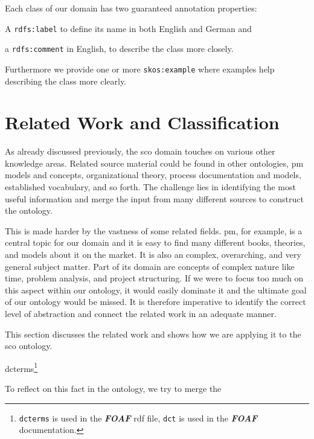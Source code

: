 \documentclass[a4paper, DIV=13, BCOR=0cm]{scrbook}
\newcommand{\prop}[1]{\texttt{#1}}
\newcommand{\pn}[1]{\textit{\textbf{#1}}}
\begin{document}
Each class of our domain has two guaranteed annotation properties:
\begin{inparaenum}
\item A \prop{rdfs:label} to define its name in both English and German and
\item a \prop{rdfs:comment} in English, to describe the class more closely.
\end{inparaenum}
Furthermore we provide one or more \prop{skos:example} where examples help describing the class more clearly.

\section{Related Work and Classification }
\label{related-work}
As already discussed previously, the \gls{sco} domain touches on various other knowledge areas. Related source material could be found in other ontologies, \gls{pm} models and concepts, organizational theory, process documentation and models, established vocabulary, and so forth. The challenge lies in identifying the most useful information and merge the input from many different sources to construct the ontology.

This is made harder by the vastness of some related fields. \gls{pm}, for example, is a central topic for our domain and it is easy to find many different books, theories, and models about it on the market. It is also an complex, overarching, and very general subject matter. Part of its domain are concepts of complex nature like time, problem analysis, and project structuring. If we were to focus too much on this aspect within our ontology, it would easily dominate it and the ultimate goal of our ontology would be  missed. It is therefore imperative to identify the correct level of abstraction and connect the related work in an adequate manner.

This section discusses the related work and shows how we are applying it to the \gls{sco} ontology.



dcterms\footnote{\texttt{dcterms} is used in the \pn{FOAF} rdf file, \texttt{dct} is used in the \pn{FOAF} documentation.}


To reflect on this fact in the ontology, we try to merge the
\end{document}
